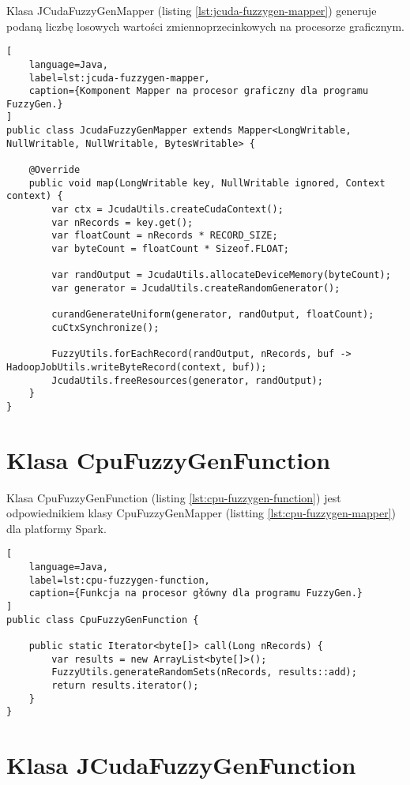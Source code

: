 Klasa JCudaFuzzyGenMapper (listing \ref{lst:jcuda-fuzzygen-mapper}) generuje podaną liczbę losowych
wartości zmiennoprzecinkowych na procesorze graficznym.

\begin{lstlisting}[
    language=Java,
    label=lst:jcuda-fuzzygen-mapper,
    caption={Komponent Mapper na procesor graficzny dla programu FuzzyGen.}
]
public class JcudaFuzzyGenMapper extends Mapper<LongWritable, NullWritable, NullWritable, BytesWritable> {

    @Override
    public void map(LongWritable key, NullWritable ignored, Context context) {
        var ctx = JcudaUtils.createCudaContext();
        var nRecords = key.get();
        var floatCount = nRecords * RECORD_SIZE;
        var byteCount = floatCount * Sizeof.FLOAT;

        var randOutput = JcudaUtils.allocateDeviceMemory(byteCount);
        var generator = JcudaUtils.createRandomGenerator();

        curandGenerateUniform(generator, randOutput, floatCount);
        cuCtxSynchronize();

        FuzzyUtils.forEachRecord(randOutput, nRecords, buf -> HadoopJobUtils.writeByteRecord(context, buf));
        JcudaUtils.freeResources(generator, randOutput);
    }
}
\end{lstlisting}
\newpage

\section*{Klasa CpuFuzzyGenFunction} \label{ch:cpu-fuzzygen-function}

Klasa CpuFuzzyGenFunction (listing \ref{lst:cpu-fuzzygen-function}) jest odpowiednikiem
klasy CpuFuzzyGenMapper (listting \ref{lst:cpu-fuzzygen-mapper}) dla platformy Spark.

\begin{lstlisting}[
    language=Java,
    label=lst:cpu-fuzzygen-function,
    caption={Funkcja na procesor główny dla programu FuzzyGen.}
]
public class CpuFuzzyGenFunction {

    public static Iterator<byte[]> call(Long nRecords) {
        var results = new ArrayList<byte[]>();
        FuzzyUtils.generateRandomSets(nRecords, results::add);
        return results.iterator();
    }
}
\end{lstlisting}
\newpage

\section*{Klasa JCudaFuzzyGenFunction} \label{ch:jcuda-fuzzygen-function}

